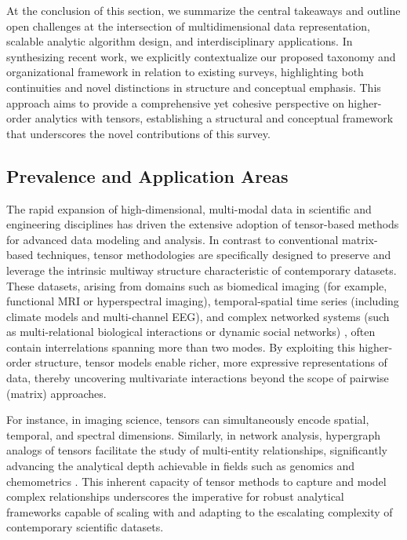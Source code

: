 \documentclass[sigconf]{acmart}
\begin{document}
At the conclusion of this section, we summarize the central takeaways and outline open challenges at the intersection of multidimensional data representation, scalable analytic algorithm design, and interdisciplinary applications. In synthesizing recent work, we explicitly contextualize our proposed taxonomy and organizational framework in relation to existing surveys, highlighting both continuities and novel distinctions in structure and conceptual emphasis. This approach aims to provide a comprehensive yet cohesive perspective on higher-order analytics with tensors, establishing a structural and conceptual framework that underscores the novel contributions of this survey.

\subsection{Prevalence and Application Areas}

The rapid expansion of high-dimensional, multi-modal data in scientific and engineering disciplines has driven the extensive adoption of tensor-based methods for advanced data modeling and analysis. In contrast to conventional matrix-based techniques, tensor methodologies are specifically designed to preserve and leverage the intrinsic multiway structure characteristic of contemporary datasets. These datasets, arising from domains such as biomedical imaging (for example, functional MRI or hyperspectral imaging), temporal-spatial time series (including climate models and multi-channel EEG), and complex networked systems (such as multi-relational biological interactions or dynamic social networks) \cite{ref104}, often contain interrelations spanning more than two modes. By exploiting this higher-order structure, tensor models enable richer, more expressive representations of data, thereby uncovering multivariate interactions beyond the scope of pairwise (matrix) approaches.

For instance, in imaging science, tensors can simultaneously encode spatial, temporal, and spectral dimensions. Similarly, in network analysis, hypergraph analogs of tensors facilitate the study of multi-entity relationships, significantly advancing the analytical depth achievable in fields such as genomics and chemometrics \cite{ref104}. This inherent capacity of tensor methods to capture and model complex relationships underscores the imperative for robust analytical frameworks capable of scaling with and adapting to the escalating complexity of contemporary scientific datasets.
\end{document}
